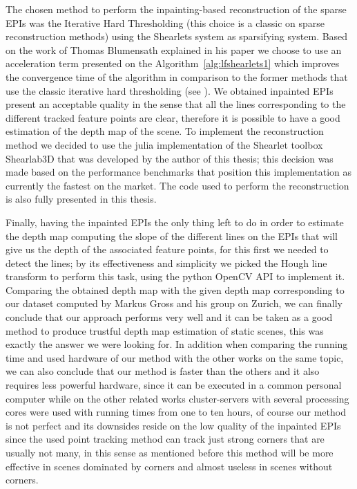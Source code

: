 \bigskip

The chosen method to perform the inpainting-based reconstruction of the sparse EPIs was the Iterative Hard Thresholding (this choice is a classic on sparse reconstruction methods) using the Shearlets system as sparsifying system. Based on the work of Thomas Blumensath explained in his paper \cite{hard-thresholding} we choose to use an acceleration term presented on the Algorithm~\ref{alg:lfshearlets1} which improves the convergence time of the algorithm in comparison to the former methods that use the classic iterative hard thresholding (see \cite{clustered-inpainting}). We obtained inpainted EPIs present an acceptable quality in the sense that all the lines corresponding to the different tracked feature points are clear, therefore it is possible to have a good estimation of the depth map of the scene. To implement the reconstruction method we decided to use the julia implementation of the Shearlet toolbox Shearlab3D that was developed by the author of this thesis; this decision was made based on the performance benchmarks that position this implementation as currently the fastest on the market. The code used to perform the reconstruction is also fully presented in this thesis.

\bigskip

Finally, having the inpainted EPIs the only thing left to do in order to estimate the depth map computing the slope of the different lines on the EPIs that will give us the depth of the associated feature points, for this first we needed to detect the lines; by its effectiveness and simplicity we picked the Hough line transform to perform this task, using the python OpenCV API to implement it. Comparing the obtained depth map with the given depth map corresponding to our dataset computed by Markus Gross and his group on Zurich, we can finally conclude that our approach performs very well and it can be taken as a good method to produce trustful depth map estimation of static scenes, this was exactly the answer we were looking for. In addition when comparing the running time and used hardware of our method with the other works on the same topic, we can also conclude that our method is faster than the others and it also requires less powerful hardware, since it can be executed in a common personal computer while on the other related works cluster-servers with several processing cores were used with running times from one to ten hours, of course our method is not perfect and its downsides reside on the low quality of the inpainted EPIs since the used point tracking method can track just strong corners that are usually not many, in this sense as mentioned before this method will be more effective in scenes dominated by corners and almost useless in scenes without corners.

